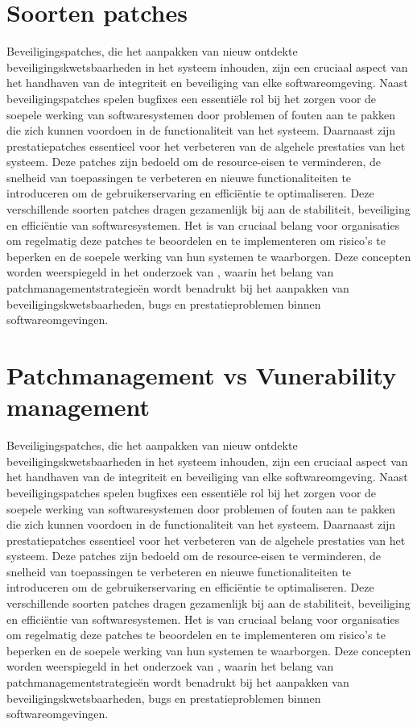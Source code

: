 \section{Soorten patches}
Beveiligingspatches, die het aanpakken van nieuw ontdekte beveiligingskwetsbaarheden in het systeem inhouden, zijn een cruciaal aspect van het handhaven van de integriteit en beveiliging van elke softwareomgeving. Naast beveiligingspatches spelen bugfixes een essentiële rol bij het zorgen voor de soepele werking van softwaresystemen door problemen of fouten aan te pakken die zich kunnen voordoen in de functionaliteit van het systeem. Daarnaast zijn prestatiepatches essentieel voor het verbeteren van de algehele prestaties van het systeem. Deze patches zijn bedoeld om de resource-eisen te verminderen, de snelheid van toepassingen te verbeteren en nieuwe functionaliteiten te introduceren om de gebruikerservaring en efficiëntie te optimaliseren.
Deze verschillende soorten patches dragen gezamenlijk bij aan de stabiliteit, beveiliging en efficiëntie van softwaresystemen. Het is van cruciaal belang voor organisaties om regelmatig deze patches te beoordelen en te implementeren om risico's te beperken en de soepele werking van hun systemen te waarborgen.
Deze concepten worden weerspiegeld in het onderzoek van \textcite{Wrobel2023}, waarin het belang van patchmanagementstrategieën wordt benadrukt bij het aanpakken van beveiligingskwetsbaarheden, bugs en prestatieproblemen binnen softwareomgevingen.
\section{Patchmanagement vs Vunerability management}
Beveiligingspatches, die het aanpakken van nieuw ontdekte beveiligingskwetsbaarheden in het systeem inhouden, zijn een cruciaal aspect van het handhaven van de integriteit en beveiliging van elke softwareomgeving. Naast beveiligingspatches spelen bugfixes een essentiële rol bij het zorgen voor de soepele werking van softwaresystemen door problemen of fouten aan te pakken die zich kunnen voordoen in de functionaliteit van het systeem. Daarnaast zijn prestatiepatches essentieel voor het verbeteren van de algehele prestaties van het systeem. Deze patches zijn bedoeld om de resource-eisen te verminderen, de snelheid van toepassingen te verbeteren en nieuwe functionaliteiten te introduceren om de gebruikerservaring en efficiëntie te optimaliseren.
Deze verschillende soorten patches dragen gezamenlijk bij aan de stabiliteit, beveiliging en efficiëntie van softwaresystemen. Het is van cruciaal belang voor organisaties om regelmatig deze patches te beoordelen en te implementeren om risico's te beperken en de soepele werking van hun systemen te waarborgen.
Deze concepten worden weerspiegeld in het onderzoek van \textcite{Wrobel2023}, waarin het belang van patchmanagementstrategieën wordt benadrukt bij het aanpakken van beveiligingskwetsbaarheden, bugs en prestatieproblemen binnen softwareomgevingen.

